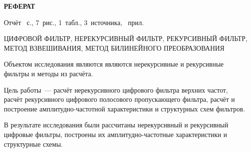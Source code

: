 \begin{center}
  \Large{\textbf{РЕФЕРАТ}}
\end{center}

Отчёт ~с., 7~рис., 1~табл., 3~источника,
~прил.


ЦИФРОВОЙ ФИЛЬТР, НЕРЕКУРСИВНЫЙ ФИЛЬТР, РЕКУРСИВНЫЙ ФИЛЬТР, МЕТОД
ВЗВЕШИВАНИЯ, МЕТОД БИЛИНЕЙНОГО ПРЕОБРАЗОВАНИЯ

Объектом исследования являются являются нерекурсивные и рекурсивные
фильтры и методы из расчёта.

Цель работы~--- расчёт нерекурсивного цифрового фильтра верхних
частот, расчёт рекурсивного цифрового полосового пропускающего
фильтра, расчёт и построение амплитудно-частотной характеристики
и структурных схем фильтров.

В результате исследования были рассчитаны нерекурсивный и рекурсивный
цифровые фильтры, построены их амплитудно-частот\-ные характеристики и
структурные схемы.

\newpage



